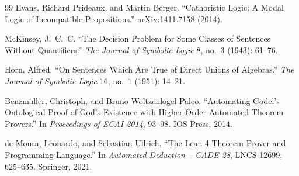\documentclass[10pt, letterpaper]{article}
\theoremstyle{remark}
\begin{document}
\begin{thebibliography}{99}
Evans, Richard Prideaux, and Martin Berger. ``Cathoristic Logic: A Modal
Logic of Incompatible Propositions.'' arXiv:1411.7158 (2014).

McKinsey, J.~C.~C. ``The Decision Problem for Some Classes of Sentences
Without Quantifiers.'' \emph{The Journal of Symbolic Logic} 8, no.~3 (1943):
61--76.

Horn, Alfred. ``On Sentences Which Are True of Direct Unions of Algebras.''
\emph{The Journal of Symbolic Logic} 16, no.~1 (1951): 14--21.

Benzm\"uller, Christoph, and Bruno Woltzenlogel Paleo. ``Automating G\"odel's
Ontological Proof of God's Existence with Higher-Order Automated Theorem
Provers.'' In \emph{Proceedings of ECAI 2014}, 93--98. IOS Press, 2014.

de Moura, Leonardo, and Sebastian Ullrich. ``The Lean 4 Theorem Prover and
Programming Language.'' In \emph{Automated Deduction -- CADE 28}, LNCS 12699,
625--635. Springer, 2021.

\end{thebibliography}
\end{document}
